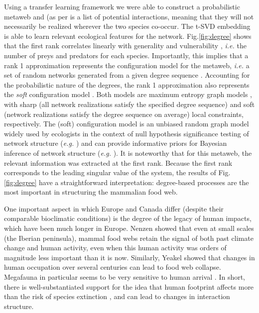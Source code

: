 Using a transfer learning framework we were able to construct a
probabilistic metaweb and (as per \cite{Dunne2006NetStr} is a list of
potential interactions, meaning that they will not necessarily be
realized wherever the two species co-occur. The t-SVD embedding is able
to learn relevant ecological features for the network. Fig.\ref{fig:degree} shows
that the first rank correlates linearly with generality and
vulnerability \cite{Schoener1989FooWeb}, \emph{i.e.} the number of preys
and predators for each species. Importantly, this implies that a rank 1
approximation represents the configuration model for the metaweb,
\emph{i.e.} a set of random networks generated from a given degree
sequence \cite{Park2004StaMec}. Accounting for the probabilistic nature
of the degrees, the rank 1 approximation also represents the \emph{soft}
configuration model \cite{vanderHoorn2018SpaMax}. Both models are
maximum entropy graph models \cite{Garlaschelli2018CovStr}, with sharp
(all network realizations satisfy the specified degree sequence) and
soft (network realizations satisfy the degree sequence on average) local
constraints, respectively. The (soft) configuration model is an unbiased
random graph model widely used by ecologists in the context of null
hypothesis significance testing of network structure (\emph{e.g.}
\cite{Bascompte2003NesAss}) and can provide informative priors for Bayesian
inference of network structure (\emph{e.g.} \cite{Young2021BayInf}). It is
noteworthy that for this metaweb, the relevant information was extracted
at the first rank. Because the first rank corresponds to the leading
singular value of the system, the results of Fig.\ref{fig:degree} have a
straightforward interpretation: degree-based processes are the most
important in structuring the mammalian food web.

One important aspect in which Europe and Canada differ (despite their
comparable bioclimatic conditions) is the degree of the legacy of human
impacts, which have been much longer in Europe. Nenzen\cite{Nenzen2014Imp850} showed
that even at small scales (the Iberian peninsula), mammal food webs
retain the signal of both past climate change and human activity, even
when this human activity was orders of magnitude less important than it
is now. Similarly, Yeakel\cite{Yeakel2014ColEco} showed that changes in human
occupation over several centuries can lead to food web collapse.
Megafauna in particular seems to be very sensitive to human arrival
\cite{Pires2015PleMeg}. In short, there is well-substantiated support
for the idea that human footprint affects more than the risk of species
extinction \cite{Marco2018ChaHum}, and can lead to changes in
interaction structure.

